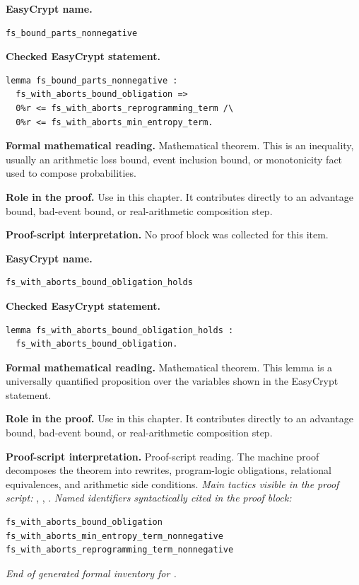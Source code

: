 \begin{formaltheorem}
\noindent\textbf{EasyCrypt name.}
\begin{lstlisting}[language=EasyCrypt,basicstyle=\ttfamily\scriptsize]
fs_bound_parts_nonnegative
\end{lstlisting}
\noindent\textbf{Checked EasyCrypt statement.}
\begin{lstlisting}[language=EasyCrypt,basicstyle=\ttfamily\scriptsize]
lemma fs_bound_parts_nonnegative :
  fs_with_aborts_bound_obligation =>
  0%r <= fs_with_aborts_reprogramming_term /\
  0%r <= fs_with_aborts_min_entropy_term.
\end{lstlisting}
\noindent\textbf{Formal mathematical reading.}
Mathematical theorem. This is an inequality, usually an arithmetic loss bound, event inclusion bound, or monotonicity fact used to compose probabilities.

\noindent\textbf{Role in the proof.}
Use in this chapter. It contributes directly to an advantage bound, bad-event bound, or real-arithmetic composition step.

\noindent\textbf{Proof-script interpretation.}
No proof block was collected for this item.

\end{formaltheorem}

\begin{formaltheorem}
\noindent\textbf{EasyCrypt name.}
\begin{lstlisting}[language=EasyCrypt,basicstyle=\ttfamily\scriptsize]
fs_with_aborts_bound_obligation_holds
\end{lstlisting}
\noindent\textbf{Checked EasyCrypt statement.}
\begin{lstlisting}[language=EasyCrypt,basicstyle=\ttfamily\scriptsize]
lemma fs_with_aborts_bound_obligation_holds :
  fs_with_aborts_bound_obligation.
\end{lstlisting}
\noindent\textbf{Formal mathematical reading.}
Mathematical theorem. This lemma is a universally quantified proposition over the variables shown in the EasyCrypt statement.

\noindent\textbf{Role in the proof.}
Use in this chapter. It contributes directly to an advantage bound, bad-event bound, or real-arithmetic composition step.

\noindent\textbf{Proof-script interpretation.}
Proof-script reading. The machine proof decomposes the theorem into rewrites, program-logic obligations, relational equivalences, and arithmetic side conditions.
\emph{Main tactics visible in the proof script:} , , .
\emph{Named identifiers syntactically cited in the proof block:}
\begin{lstlisting}[language=EasyCrypt,basicstyle=\ttfamily\scriptsize]
fs_with_aborts_bound_obligation
fs_with_aborts_min_entropy_term_nonnegative
fs_with_aborts_reprogramming_term_nonnegative
\end{lstlisting}

\end{formaltheorem}

\medskip
\noindent\emph{End of generated formal inventory for .}
